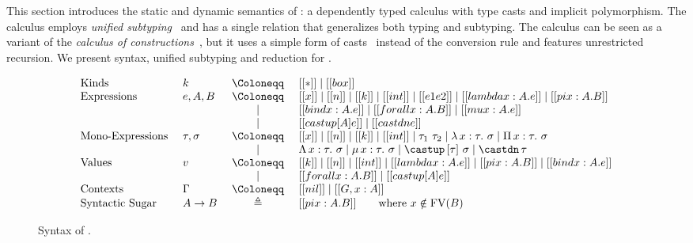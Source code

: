 \section{\System}

This section introduces the static and dynamic semantics of
\name: a dependently typed calculus with type casts
and implicit polymorphism. The calculus employs
\emph{unified subtyping}~\cite{CoquandThierry1988Tcoc}
and has a single relation that generalizes both typing and subtyping.
The calculus can be seen as a variant of the \emph{calculus of constructions}~\cite{},
but it uses a simple form of casts~\cite{} instead of the conversion rule
and features unrestricted recursion. We present syntax, unified subtyping
and reduction for \name.

\begin{figure}[t]
\centering
\begin{equation*}
\begin{array}{llcl}
    \text{Kinds} & k & ~\Coloneqq ~ & [[*]] \mid [[box]] \\
    \text{Expressions} & e, A, B & ~ \Coloneqq ~ & [[x]] \mid [[n]] \mid [[k]] \mid [[int]] \mid [[e1 e2]] \mid [[lambda x : A. e]] \mid [[pi x : A. B]] \\
        & & \mid & [[bind x : A. e]] \mid [[forall x : A. B]] \mid [[mu x : A. e]] \\
        & & \mid & [[castup [A] e]] \mid [[castdn e]]   \\
    \text{Mono-Expressions} ~ & \tau, \sigma & ~ \Coloneqq ~ & [[x]] \mid [[n]] \mid [[k]] \mid [[int]] \mid \tau_1 ~ \tau_2 \mid \lambda \, x : \tau. ~ \sigma \mid \Pi \, x : \tau. ~ \sigma \\
        & & \mid & \Lambda \, x : \tau. ~ \sigma \mid \mu \, x : \tau. ~ \sigma \mid \castup \, [\tau]~ \sigma \mid \castdn \, \tau \\
    \text{Values} & v & ~ \Coloneqq ~ & [[k]] \mid [[n]] \mid [[int]] \mid [[lambda x : A. e]] \mid [[pi x : A. B]] \mid [[bind x : A. e]] \\
        & & \mid & [[forall x : A. B]] \mid [[castup [A] e]] \\
    \text{Contexts} & \Gamma & ~ \Coloneqq ~ & [[nil]] \mid [[G , x : A]] \\
    \text{Syntactic Sugar} ~ & A \rightarrow B & \triangleq & [[pi x : A. B]] \qquad \text{where} ~ x \notin \mathrm{FV}(B)
\end{array}
\end{equation*}
\caption{Syntax of \name.}
\label{fig:syntax}
\end{figure}

